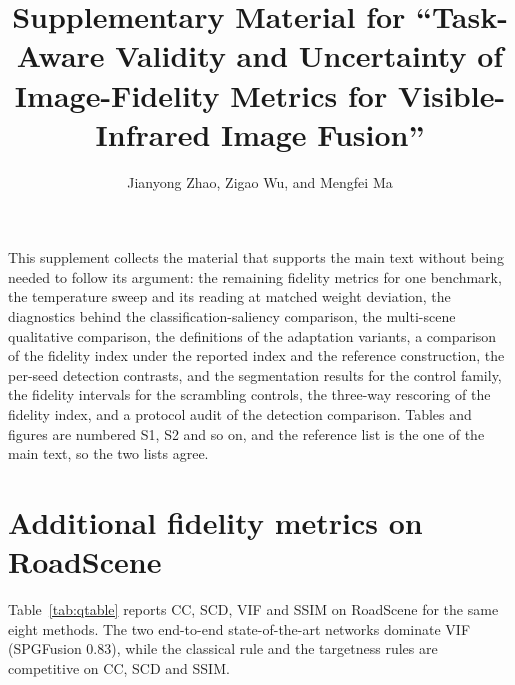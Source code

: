 \documentclass[11pt,a4paper]{article}
\begin{document}
\title{Supplementary Material for ``Task-Aware Validity and Uncertainty of
Image-Fidelity Metrics for Visible-Infrared Image Fusion''}
\author{Jianyong Zhao, Zigao Wu, and Mengfei Ma}
\date{}
\maketitle

This supplement collects the material that supports the main text without being
needed to follow its argument: the remaining fidelity metrics for one benchmark,
the temperature sweep and its reading at matched weight deviation, the diagnostics
behind the classification-saliency comparison, the multi-scene qualitative
comparison, the definitions of the adaptation variants, a comparison of the
fidelity index under the reported index and the reference construction, the per-seed
detection contrasts, and
the segmentation results for the control family, the fidelity intervals for the
scrambling controls, the three-way rescoring of the fidelity index, and a protocol
audit of the detection comparison. Tables and figures are numbered
S1, S2 and so on, and the reference list is the one of the main text, so the two
lists agree.

\section{Additional fidelity metrics on RoadScene}

Table~\ref{tab:qtable} reports CC, SCD, VIF and SSIM on RoadScene for the same
eight methods. The two end-to-end state-of-the-art networks dominate VIF
(SPGFusion 0.83), while the classical rule and the targetness rules are
competitive on CC, SCD and SSIM.
\end{document}
